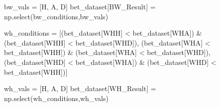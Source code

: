 \documentclass[
  letterpaper,
  DIV=11,
  numbers=noendperiod]{scrartcl}
\newenvironment{Shaded}{\begin{snugshade}}{\end{snugshade}}
\newcommand{\NormalTok}[1]{\textcolor[rgb]{0.00,0.23,0.31}{#1}}
\newcommand{\OperatorTok}[1]{\textcolor[rgb]{0.37,0.37,0.37}{#1}}
\newcommand{\StringTok}[1]{\textcolor[rgb]{0.13,0.47,0.30}{#1}}
\begin{document}
\begin{Shaded}
\begin{Highlighting}[]
\NormalTok{bw\_vals }\OperatorTok{=}\NormalTok{ [}\StringTok{\textquotesingle{}H\textquotesingle{}}\NormalTok{, }\StringTok{\textquotesingle{}A\textquotesingle{}}\NormalTok{, }\StringTok{\textquotesingle{}D\textquotesingle{}}\NormalTok{]}
\NormalTok{bet\_dataset[}\StringTok{\textquotesingle{}BW\_Result\textquotesingle{}}\NormalTok{] }\OperatorTok{=}\NormalTok{ np.select(bw\_conditions,bw\_vals)}

\NormalTok{wh\_conditions }\OperatorTok{=}\NormalTok{ [(bet\_dataset[}\StringTok{\textquotesingle{}WHH\textquotesingle{}}\NormalTok{] }\OperatorTok{\textless{}}\NormalTok{ bet\_dataset[}\StringTok{\textquotesingle{}WHA\textquotesingle{}}\NormalTok{]) }\OperatorTok{\&}\NormalTok{ (bet\_dataset[}\StringTok{\textquotesingle{}WHH\textquotesingle{}}\NormalTok{] }\OperatorTok{\textless{}}\NormalTok{ bet\_dataset[}\StringTok{\textquotesingle{}WHD\textquotesingle{}}\NormalTok{]),}
\NormalTok{                   (bet\_dataset[}\StringTok{\textquotesingle{}WHA\textquotesingle{}}\NormalTok{] }\OperatorTok{\textless{}}\NormalTok{ bet\_dataset[}\StringTok{\textquotesingle{}WHH\textquotesingle{}}\NormalTok{]) }\OperatorTok{\&}\NormalTok{ (bet\_dataset[}\StringTok{\textquotesingle{}WHA\textquotesingle{}}\NormalTok{] }\OperatorTok{\textless{}}\NormalTok{ bet\_dataset[}\StringTok{\textquotesingle{}WHD\textquotesingle{}}\NormalTok{]),}
\NormalTok{                   (bet\_dataset[}\StringTok{\textquotesingle{}WHD\textquotesingle{}}\NormalTok{] }\OperatorTok{\textless{}}\NormalTok{ bet\_dataset[}\StringTok{\textquotesingle{}WHA\textquotesingle{}}\NormalTok{]) }\OperatorTok{\&}\NormalTok{ (bet\_dataset[}\StringTok{\textquotesingle{}WHD\textquotesingle{}}\NormalTok{] }\OperatorTok{\textless{}}\NormalTok{ bet\_dataset[}\StringTok{\textquotesingle{}WHH\textquotesingle{}}\NormalTok{])]}

\NormalTok{wh\_vals }\OperatorTok{=}\NormalTok{ [}\StringTok{\textquotesingle{}H\textquotesingle{}}\NormalTok{, }\StringTok{\textquotesingle{}A\textquotesingle{}}\NormalTok{, }\StringTok{\textquotesingle{}D\textquotesingle{}}\NormalTok{]}
\NormalTok{bet\_dataset[}\StringTok{\textquotesingle{}WH\_Result\textquotesingle{}}\NormalTok{] }\OperatorTok{=}\NormalTok{ np.select(wh\_conditions,wh\_vals)}


\end{Highlighting}
\end{Shaded}
\end{document}

